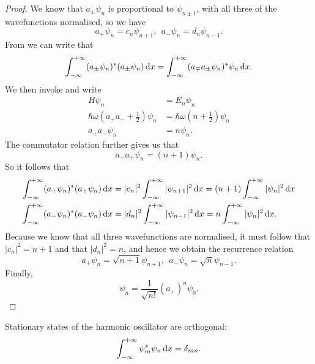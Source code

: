 \begin{proof}
We know that $a_{\pm}\psi_n$ is proportional to $\psi_{n\pm1}$, with all three of the wavefunctions normalised, so we have 
\begin{equation}
a_+\psi_n=c_n\psi_{n+1},\ \ a_-\psi_n=d_n\psi_{n-1}.
\end{equation}
From  we can write that 
\begin{equation}
\intinf(a_{\pm}\psi_n)^*(a_{\pm}\psi_n)\dx=\intinf(a_{\mp}a_{\pm}\psi_n)^*\psi_n\dx.
\end{equation}
We then invoke  and write
\begin{subequations}
\begin{align}
H\psi_n&=E_n\psi_n\\
\hbar\omega\left(a_+a_-+\frac{1}{2}\right)\psi_n&=\hbar\omega\left(n+\frac{1}{2}\right)\psi_n\\
a_+a_-\psi_n&=n\psi_n. \label{apmn}
\end{align}
\end{subequations}
The commutator relation further gives us that 
\begin{equation}
\label{ampn}
a_-a_+\psi_n=(n+1)\psi_n.
\end{equation}
So it follows that 
\begin{subequations}
\begin{align}
\intinf(a_+\psi_n)^*(a_+\psi_n)\dx&=|c_n|^2\intinf|\psi_{n+1}|^2\dx=(n+1)\intinf |\psi_n|^2\dx\\
\intinf(a_-\psi_n)^*(a_-\psi_n)\dx&=|d_n|^2\intinf|\psi_{n-1}|^2\dx=n\intinf |\psi_n|^2\dx.
\end{align}
\end{subequations}
Because we know that all three wavefunctions are normalised, it must follow that
$|c_n|^2=n+1$ and that $|d_n|^2=n$, and hence we obtain the recurrence relation 
\begin{equation}
a_+\psi_n=\sqrt{n+1}\psi_{n+1},\ \ a_-\psi_n=\sqrt{n}\psi_{n-1}.
\end{equation}
Finally, 
\begin{equation}
\psi_n=\frac{1}{\sqrt{n!}}(a_+)^n\psi_0.
\end{equation}

\end{proof}
\begin{thrm}[Orthonormality]
Stationary states of the harmonic oscillator are orthogonal: 
\begin{equation}
\intinf\psi_m^*\psi_n\dx=\delta_{mn}.
\end{equation}
\end{thrm}
